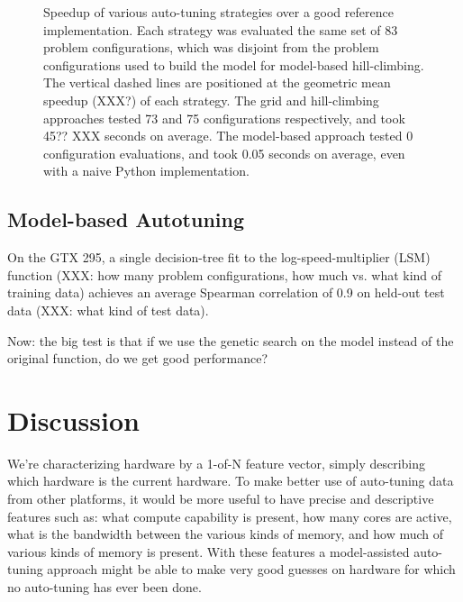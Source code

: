 \documentclass{sig-alternate}
\begin{document}
\begin{figure}
\caption{Speedup of various auto-tuning strategies over a good reference
implementation.
Each strategy was evaluated the same set of 83 problem configurations, which
was disjoint from the problem configurations used to build the model for
model-based hill-climbing.
The vertical dashed lines are positioned at the geometric mean speedup (XXX?)
of each strategy. The grid and hill-climbing approaches
tested 73 and 75 configurations respectively, and took 45?? XXX
seconds on average.
The model-based approach tested 0 configuration evaluations, and took 0.05
seconds on average, even with a naive Python implementation.
}
\label{fig:speedup_295}
\end{figure}


\subsection{Model-based Autotuning}

On the GTX 295, a single decision-tree fit to the log-speed-multiplier
(LSM) function (XXX: how many problem configurations, how much vs. what
kind of training data) achieves an average Spearman correlation of 0.9 on
held-out test data (XXX: what kind of test data).

Now: the big test is that if we use the genetic search on the model instead of
the original function, do we get good performance?

\section{Discussion}

We're characterizing hardware by a 1-of-N feature vector, simply describing
which hardware is the current hardware.
To make better use of auto-tuning data from other platforms, it would be more
useful to have precise and descriptive features such as: what compute
capability is present, how many cores are active, what is the bandwidth
between the various kinds of memory, and how much of various kinds of memory
is present.  With these features a model-assisted auto-tuning approach
might be able to make very good guesses on hardware for which no auto-tuning
has ever been done.
\end{document}
